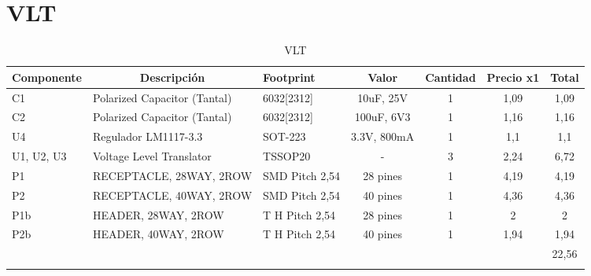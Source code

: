 \section{VLT}
\begin{longtable}{|l|p{3cm}|p{2cm}|c|c|c|c|}
\hline
\multicolumn{1}{|c|}{\textbf{Componente}} & \multicolumn{1}{c|}{\textbf{Descripción}} & \textbf{ Footprint} & \textbf{Valor} & \textbf{Cantidad} & \textbf{Precio x1} & \textbf{Total} \\ \hline
C1 & Polarized Capacitor (Tantal) & 6032[2312] & 10uF, 25V & 1 & 1,09 & 1,09 \\ \hline
C2 & Polarized Capacitor (Tantal) & 6032[2312] & 100uF, 6V3 & 1 & 1,16 & 1,16 \\ \hline
U4 & Regulador LM1117-3.3 & SOT-223 & 3.3V, 800mA & 1 & 1,1 & 1,1 \\ \hline
U1, U2, U3 & Voltage Level Translator & TSSOP20 & - & 3 & 2,24 & 6,72 \\ \hline
P1 & RECEPTACLE, 28WAY, 2ROW & SMD  Pitch 2,54 & 28 pines & 1 & 4,19 & 4,19 \\ \hline
P2 & RECEPTACLE, 40WAY, 2ROW & SMD  Pitch 2,54 & 40 pines & 1 & 4,36 & 4,36 \\ \hline
P1b & HEADER, 28WAY, 2ROW & T H Pitch 2,54 & 28 pines & 1 & 2 & 2 \\ \hline
P2b & HEADER, 40WAY, 2ROW & T H Pitch 2,54 & 40 pines & 1 & 1,94 & 1,94 \\ \hline
 &  & \multicolumn{1}{l|}{} & \multicolumn{1}{l|}{} & \multicolumn{1}{l|}{} & \multicolumn{1}{l|}{} & 22,56 \\ \hline
\caption{VLT}
\label{}
\end{longtable}


